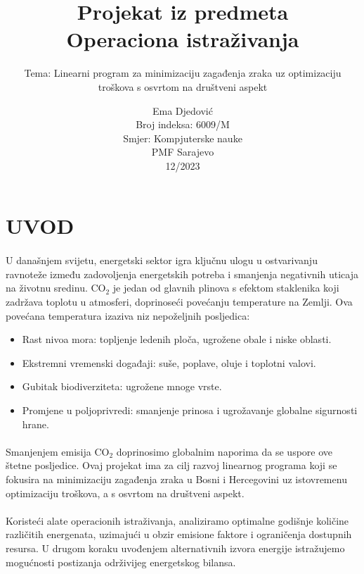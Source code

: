 \documentclass[12pt, a4paper]{paper}
\title
{\Huge Projekat iz predmeta\\
Operaciona istraživanja\bigskip}
\subtitle{\Large Tema: Linearni program za minimizaciju zagađenja zraka uz optimizaciju troškova s osvrtom na društveni aspekt}
\author{Ema Djedović \\
Broj indeksa: 6009/M \\
Smjer: Kompjuterske nauke \\
PMF Sarajevo\\
12/2023}
\begin{document}
\maketitle
\thispagestyle{empty}

\newpage
\tableofcontents
\thispagestyle{empty}

\newpage
\clearpage
{}

\section*{UVOD}

\paragraph{}
U današnjem svijetu, energetski sektor igra ključnu ulogu u ostvarivanju ravnoteže između zadovoljenja energetskih potreba i smanjenja negativnih uticaja na životnu sredinu. CO$_2$ je jedan od glavnih plinova s efektom staklenika koji zadržava toplotu u atmosferi, doprinoseći povećanju temperature na Zemlji. Ova povećana temperatura izaziva niz nepoželjnih posljedica:

\begin{itemize}
	\item Rast nivoa mora: topljenje ledenih ploča, ugrožene obale i niske oblasti.
	\item Ekstremni vremenski događaji: suše, poplave, oluje i toplotni valovi.
	\item Gubitak biodiverziteta: ugrožene mnoge vrste.
	\item Promjene u poljoprivredi: smanjenje prinosa i ugrožavanje globalne sigurnosti hrane.
\end{itemize}

\paragraph{}
Smanjenjem emisija CO$_2$ doprinosimo globalnim naporima da se uspore ove štetne posljedice. Ovaj projekat ima za cilj razvoj linearnog programa koji se fokusira na minimizaciju zagađenja zraka u Bosni i Hercegovini uz istovremenu optimizaciju troškova, a s osvrtom na društveni aspekt.

\paragraph{}
Koristeći alate operacionih istraživanja, analiziramo optimalne godišnje količine različitih energenata, uzimajući u obzir emisione faktore i ograničenja dostupnih resursa. U drugom koraku uvođenjem alternativnih izvora energije istražujemo mogućnosti postizanja održivijeg energetskog bilansa.
\end{document}
